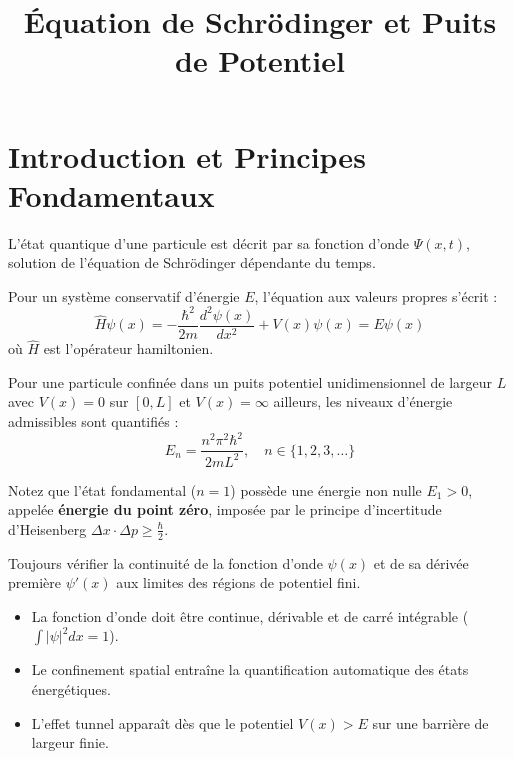 \documentclass[mode=handout, palette=emerald, lang=french, fontsize=11pt]{modernclassnotes}
\title{Équation de Schrödinger et Puits de Potentiel}
\begin{document}
\maketitle

\section{Introduction et Principes Fondamentaux}

L'état quantique d'une particule est décrit par sa fonction d'onde $\Psi(x,t)$, solution de l'équation de Schrödinger dépendante du temps.

\begin{definition}
Pour un système conservatif d'énergie $E$, l'équation aux valeurs propres s'écrit :
\begin{equation*}
  \hat{H} \psi(x) = -\frac{\hbar^2}{2m} \frac{d^2\psi(x)}{dx^2} + V(x)\psi(x) = E \psi(x)
\end{equation*}
où $\hat{H}$ est l'opérateur hamiltonien.
\end{definition}

\begin{theorem}
Pour une particule confinée dans un puits potentiel unidimensionnel de largeur $L$ avec $V(x)=0$ sur $[0,L]$ et $V(x)=\infty$ ailleurs, les niveaux d'énergie admissibles sont quantifiés :
\begin{equation*}
  E_n = \frac{n^2 \pi^2 \hbar^2}{2m L^2}, \quad n \in \{1, 2, 3, \dots\}
\end{equation*}
\end{theorem}

\begin{remark}
Notez que l'état fondamental ($n=1$) possède une énergie non nulle $E_1 > 0$, appelée \textbf{énergie du point zéro}, imposée par le principe d'incertitude d'Heisenberg $\Delta x \cdot \Delta p \ge \frac{\hbar}{2}$.
\end{remark}

\begin{tip}
Toujours vérifier la continuité de la fonction d'onde $\psi(x)$ et de sa dérivée première $\psi'(x)$ aux limites des régions de potentiel fini.
\end{tip}

\begin{takeaways}
\begin{itemize}
  \item La fonction d'onde doit être continue, dérivable et de carré intégrable ($\int |\psi|^2 dx = 1$).
  \item Le confinement spatial entraîne la quantification automatique des états énergétiques.
  \item L'effet tunnel apparaît dès que le potentiel $V(x) > E$ sur une barrière de largeur finie.
\end{itemize}
\end{takeaways}
\end{document}
